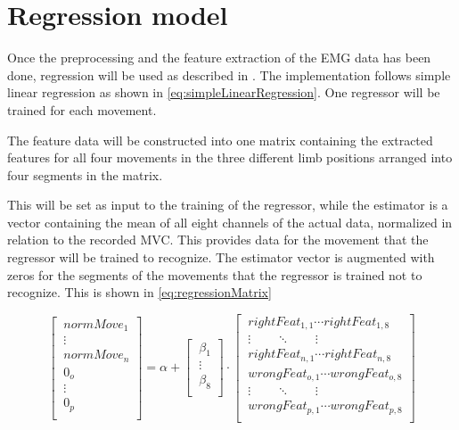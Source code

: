 \section{Regression model}


Once the preprocessing and the feature extraction of the EMG data has been done, regression will be used as described in . The implementation follows simple linear regression as shown in \eqref{eq:simpleLinearRegression}. One regressor will be trained for each movement. 


The feature data will be constructed into one matrix containing the extracted features for all four movements in the three different limb positions arranged into four segments in the matrix. 

This will be set as input to the training of the regressor, while the estimator is a vector containing the mean of all eight channels of the actual data, normalized in relation to the recorded MVC. This provides data for the movement that the regressor will be trained to recognize. The estimator vector is augmented with zeros for the segments of the movements that the regressor is trained not to recognize. This is shown in \eqref{eq:regressionMatrix}

\begin{equation} \label{eq:regressionMatrix}
\begin{bmatrix} 
\ normMove_1 \\ 
\ \vdots\\
\ normMove_n\\
\ 0_o\\
\ \vdots\\
\ 0_p\\
\end{bmatrix}=
\alpha +
\begin{bmatrix}
\ \beta_1\\
\ \vdots\\
\ \beta_8\\
\end{bmatrix} \cdot
\begin{bmatrix} 
\ rightFeat_{1,1} \cdots rightFeat_{1,8} \\ 
\ \vdots \qquad \ddots \qquad \vdots \\
\ rightFeat_{n,1} \cdots rightFeat_{n,8} \\
\ wrongFeat_{o,1} \cdots wrongFeat_{o,8} \\
\ \vdots \qquad \ddots \qquad \vdots \\
\ wrongFeat_{p,1} \cdots wrongFeat_{p,8} \\
\end{bmatrix}
\end{equation}

